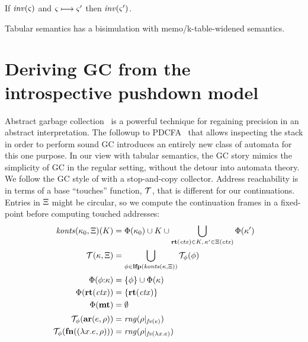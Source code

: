 \begin{lemma}\label{lem:tab-inv}
  If $\mathit{inv}(\varsigma)$ and $\varsigma \longmapsto \varsigma'$ then $\mathit{inv}(\varsigma')$.
\end{lemma}

\begin{theorem}\label{thm:global}
  Tabular semantics has a bisimulation with memo/k-table-widened semantics.
\end{theorem}

\section{Deriving GC from the introspective pushdown model}\label{sec:gc}

Abstract garbage collection~\citep{dvanhorn:Might:2006:GammaCFA} is a powerful technique for regaining precision in an abstract interpretation.
%
The followup to PDCFA~\citet{dvanhorn:Earl2012Introspective} that allows inspecting the stack in order to perform sound GC introduces an entirely new class of automata for this one purpose.
%
In our view with tabular semantics, the GC story mimics the simplicity of GC in the regular setting, without the detour into automata theory.
%
We follow the GC style of \citet{dvanhorn:Might:2006:GammaCFA} with a stop-and-copy collector.
%
Address reachability is in terms of a base ``touches'' function, ${\mathcal T}$, that is different for our continuations.
%
Entries in $\Xi$ might be circular, so we compute the continuation frames in a fixed-point before computing touched addresses:
\begin{align*}
  \mathit{konts}(\kappa_0, \Xi)(K) &= \Phi(\kappa_0) \cup K \cup \bigcup\limits_{\mathbf{rt}(\mathit{ctx}) \in K,\, \kappa' \in \Xi(\mathit{ctx})}{\Phi(\kappa')}
\\
  {\mathcal T}(\kappa, \Xi) &= \bigcup\limits_{\phi \in \mathbf{lfp}(\mathit{konts}(\kappa, \Xi))}{{\mathcal T}_{\phi}(\phi)}
\\[2pt]
  \Phi(\phi{\tt :} \kappa) &= \{ \phi \} \cup \Phi(\kappa) \\
  \Phi(\mathbf{rt}(\mathit{ctx})) &= \{ \mathbf{rt}(\mathit{ctx}) \} \\
  \Phi(\mathbf{mt}) &= \emptyset 
\\[2pt]
  {\mathcal T}_{\phi}(\mathbf{ar}{}(e,\rho)) &= \mathit{rng}(\rho|_{\mathit{fv}(e)}) \\
  {\mathcal T}_{\phi}(\mathbf{fn}{}((\lambda{} x. e,\rho))) &= \mathit{rng}(\rho|_{\mathit{fv}(\lambda{} x. e)})
\end{align*}

